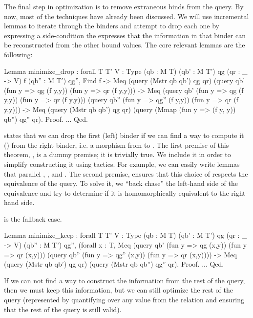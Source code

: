\documentclass[preprint]{sigplanconf}
\begin{document}
The final step in optimization is to remove extraneous binds from the query.
By now, most of the techniques have already been discussed.
We will use incremental lemmas to iterate through the binders and attempt to drop each one by expressing a side-condition the expresses that the information in that binder can be reconstructed from the other bound values.
The core relevant lemmas are the following:
\begin{coq}
Lemma minimize_drop
: forall {T T' V : Type} (qb : M T) (qb' : M T') qg (qr : _ -> V) f (qb'' : M T') qg'',
   Find f
-> Meq (query (Mstr qb qb') qg qr)
       (query qb' (fun y => qg (f y,y)) (fun y => qr (f y,y)))
-> Meq (query qb' (fun y => qg (f y,y)) (fun y => qr (f y,y)))
       (query qb'' (fun y => qg'' (f y,y)) (fun y => qr (f y,y)))
-> Meq (query (Mstr qb qb') qg qr)
       (query (Mmap (fun y => (f y, y)) qb'') qg'' qr).
Proof. ... Qed.
\end{coq}
 states that we can drop the first (left) binder if we can find a way to compute it () from the right binder, i.e. a morphism from  to .
The first premise of this theorem, , is a dummy premise; it is trivially true.
We include it in order to simplify constructing it using tactics.
For example, we can easily write lemmas that parallel , , and .
The second premise, ensures that this choice of  respects the equivalence of the query.
To solve it, we ``back chase'' the left-hand side of the equivalence and try to determine if it is homomorphically equivalent to the right-hand side.

 is the fallback case.
\begin{coq}
Lemma minimize_keep
: forall {T T' V : Type} (qb : M T) (qb' : M T') qg (qr : _ -> V) (qb'' : M T') qg'',
  (forall x : T,
   Meq (query qb' (fun y => qg (x,y)) (fun y => qr (x,y)))
       (query qb'' (fun y => qg'' (x,y)) (fun y => qr (x,y)))) ->
  Meq (query (Mstr qb qb') qg qr)
      (query (Mstr qb qb'') qg'' qr).
Proof. ... Qed.
\end{coq}
If we can not find a way to construct the information from the rest of the query, then we must keep this information, but we can still optimize the rest of the query (represented by quantifying over any value from the relation and ensuring that the rest of the query is still valid).
\end{document}
